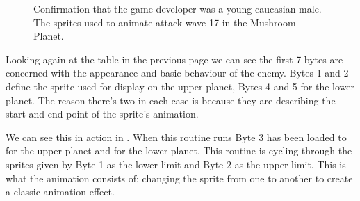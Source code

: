 \begin{figure}[H]
  {
    \setlength{\tabcolsep}{3.0pt}
    \setlength\cmidrulewidth{\heavyrulewidth} %
	\centering
	\def\MULTICOLORONE{red}
	\def\MULTICOLORTWO{white}
	\def\SPRITECOLOR{orange}
	\begin{subfigure}{0.3\textwidth}
		
	\end{subfigure}
	\begin{subfigure}{0.3\textwidth}
		
	\end{subfigure}
	\begin{subfigure}{0.3\textwidth}
		
	\end{subfigure}
  }\caption[position=top]{Confirmation that the game developer was a young caucasian male. The sprites used to animate attack wave 17 in the Mushroom Planet.}
\end{figure}

Looking again at the table in the previous page we can see the first 7 bytes are concerned with the appearance and basic behaviour of the
enemy. Bytes 1 and 2 define the sprite used for display on the upper planet, Bytes 4 and 5
for the lower planet. The reason there's two in each case is because they are describing the
start and end point of the sprite's animation. 

We can see this in action in . When this routine runs Byte 3 has been loaded
to  for the upper planet and 
for the lower planet. This routine is cycling through the sprites given by Byte 1 as the lower limit and Byte 2 as 
the upper limit. This is what the animation consists of: changing the sprite from
one to another to create a classic animation effect.

